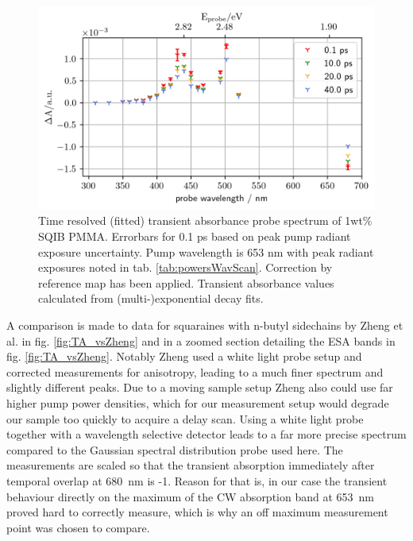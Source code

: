 \documentclass[twoside,openright,listof=numbered]{scrreprt}
\begin{document}
\begin{figure}[hbt]
\centering
\includegraphics[scale=1]{images/TimeResolvedWavelengthScanSQIB1perc_PMMA_mapCorrected.png}
\caption[Fitted transient absorbance probe spectrum of 1wt\% SQIB PMMA at pump \qty{653}{\nano\meter}.]{Time resolved (fitted) transient absorbance probe spectrum of 1wt\% SQIB PMMA. Errorbars for 0.1 ps based on peak pump radiant exposure uncertainty. Pump wavelength is 653 nm with peak radiant exposures noted in tab. \ref{tab:powersWavScan}. Correction by reference map has been applied. Transient absorbance values calculated from (multi-)exponential decay fits.\label{fig:SQIB_PMMAwavelengthscan}}
\end{figure}

A comparison is made to data for squaraines with n-butyl sidechains by Zheng et al.\cite{Zheng2020} in fig. \ref{fig:TA_vsZheng} and in a zoomed section detailing the ESA bands in fig. \ref{fig:TA_vsZheng}. Notably Zheng\cite{Zheng2020} used a white light probe setup and corrected measurements for anisotropy, leading to a much finer spectrum and slightly different peaks. Due to a moving sample setup Zheng also could use far higher pump power densities, which for our measurement setup would degrade our sample too quickly to acquire a delay scan. Using a white light probe together with a wavelength selective detector leads to a far more precise spectrum compared to the Gaussian spectral distribution probe used here. The measurements are scaled so that the transient absorption immediately after temporal overlap at \SI{680}{\nano\meter} is -1. Reason for that is, in our case the transient behaviour directly on the maximum of the CW absorption band at \SI{653}{\nano\meter} proved hard to correctly measure, which is why an off maximum measurement point was chosen to compare.%
\end{document}
